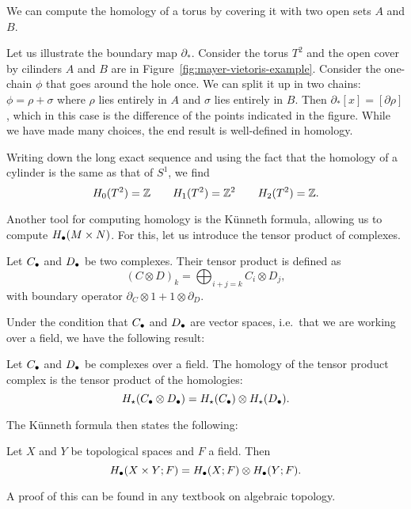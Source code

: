 \begin{eg}
    \begin{marginfigure}
        \centering
        \caption{We can compute the homology of a torus by covering it with two open sets $A$ and  $B$.}
        \label{fig:mayer-vietoris-example}
    \end{marginfigure}

    Let us illustrate the boundary map $\partial_*$.
    Consider the torus $T^{2}$ and the open cover by cilinders $A$ and $B$ are in Figure~\ref{fig:mayer-vietoris-example}.
    Consider the one-chain $\phi$ that goes around the hole once. We can split it up in two chains: $\phi = \rho + \sigma$ where  $\rho$ lies entirely in  $A$ and $\sigma$ lies entirely in  $B$.
    Then  $\partial_* [x] = [\partial \rho]$, which in this case is the difference of the points indicated in the figure.
    While we have made many choices, the end result is well-defined in homology.

    Writing down the long exact sequence and using the fact that the homology of a cylinder is the same as that of $S^{1}$, we find
    \[
        H_0(T^2) = \mathbb{Z} \qquad 
        H_1(T^2) = \mathbb{Z}^2 \qquad 
        H_2(T^2) = \mathbb{Z}
    .\] 
\end{eg}

Another tool for computing homology is the Künneth formula, allowing us to compute $H_\bullet(M \times N)$.
For this, let us introduce the tensor product of complexes.

\begin{definition}
    Let $C_\bullet$ and  $D_\bullet$ be two complexes. Their tensor product is defined as
     \[
         (C \otimes D)_k = \bigoplus_{i+j = k} C_i \otimes D_j
    ,\] 
    with boundary operator $\partial_C \otimes 1 + 1 \otimes\partial_D$.
\end{definition}
Under the condition that $C_\bullet$ and $D_\bullet$ are vector spaces, i.e.\ that we are working over a field, we have the following result:
\begin{prop}
    Let $C_\bullet$ and  $D_\bullet$ be complexes over a field.
    The homology of the tensor product complex is the tensor product of the homologies:
    \[
        H_\star(C_\bullet \otimes D_\bullet) = H_\star(C_\bullet) \otimes H_\star(D_\bullet)
    .\] 
    \label{prop:hom-tensor-is-tensor-hom}
\end{prop}
The Künneth formula then states the following:
\begin{theorem}
    Let $X$ and $Y$ be topological spaces and $F$ a field.
    Then
    \[
        H_\bullet(X \times Y; F) = H_\bullet(X; F) \otimes H_\bullet(Y; F)
    .\] 
\end{theorem}
A proof of this can be found in any textbook on algebraic topology.


